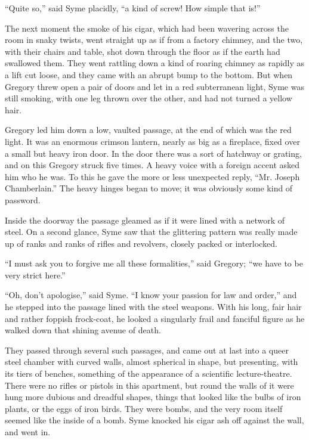 \documentclass{book}
\begin{document}
“Quite so,” said Syme placidly, “a kind of screw! How simple that is!”

The next moment the smoke of his cigar, which had been wavering across the room in snaky twists, went straight up as if from a factory chimney, and the two, with their chairs and table, shot down through the floor as if the earth had swallowed them. They went rattling down a kind of roaring chimney as rapidly as a lift cut loose, and they came with an abrupt bump to the bottom. But when Gregory threw open a pair of doors and let in a red subterranean light, Syme was still smoking, with one leg thrown over the other, and had not turned a yellow hair.

Gregory led him down a low, vaulted passage, at the end of which was the red light. It was an enormous crimson lantern, nearly as big as a fireplace, fixed over a small but heavy iron door. In the door there was a sort of hatchway or grating, and on this Gregory struck five times. A heavy voice with a foreign accent asked him who he was. To this he gave the more or less unexpected reply, “Mr. Joseph Chamberlain.” The heavy hinges began to move; it was obviously some kind of password.

Inside the doorway the passage gleamed as if it were lined with a network of steel. On a second glance, Syme saw that the glittering pattern was really made up of ranks and ranks of rifles and revolvers, closely packed or interlocked.

“I must ask you to forgive me all these formalities,” said Gregory; “we have to be very strict here.”

“Oh, don’t apologise,” said Syme. “I know your passion for law and order,” and he stepped into the passage lined with the steel weapons. With his long, fair hair and rather foppish frock-coat, he looked a singularly frail and fanciful figure as he walked down that shining avenue of death.

They passed through several such passages, and came out at last into a queer steel chamber with curved walls, almost spherical in shape, but presenting, with its tiers of benches, something of the appearance of a scientific lecture-theatre. There were no rifles or pistols in this apartment, but round the walls of it were hung more dubious and dreadful shapes, things that looked like the bulbs of iron plants, or the eggs of iron birds. They were bombs, and the very room itself seemed like the inside of a bomb. Syme knocked his cigar ash off against the wall, and went in.
\end{document}
